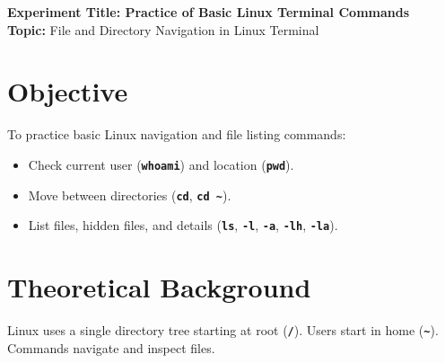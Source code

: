 \documentclass[10pt,a4paper,portrait]{article}
\newcommand{\cmd}[1]{\texttt{\textbf{#1}}}
\begin{document}
\raggedbottom
\thispagestyle{firstpage}

\begin{center}
  {\Large\bfseries\sffamily\color{primary} Experiment Title: Practice of Basic Linux Terminal Commands}\\[3pt]
  {\normalsize\sffamily\textbf{Topic:} File and Directory Navigation in Linux Terminal}
\end{center}
\vspace{-4pt}

\section{Objective}
To practice basic Linux navigation and file listing commands:
\begin{itemize}[noitemsep,topsep=1pt,leftmargin=1.2em]
  \item Check current user (\cmd{whoami}) and location (\cmd{pwd}).
  \item Move between directories (\cmd{cd}, \cmd{cd \textasciitilde}).
  \item List files, hidden files, and details (\cmd{ls}, \cmd{-l}, \cmd{-a}, \cmd{-lh}, \cmd{-la}).
\end{itemize}

\section{Theoretical Background}
Linux uses a single directory tree starting at root (\cmd{/}). Users start in home (\cmd{\textasciitilde}). Commands navigate and inspect files.
\end{document}

